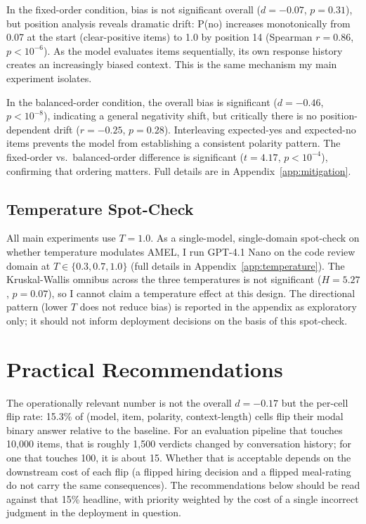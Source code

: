 \documentclass[10pt,twocolumn]{article}
\begin{document}
In the fixed-order condition, bias is not significant overall ($d = -0.07$, $p = 0.31$), but position analysis reveals dramatic drift: P(no) increases monotonically from 0.07 at the start (clear-positive items) to 1.0 by position 14 (Spearman $r = 0.86$, $p < 10^{-6}$).
As the model evaluates items sequentially, its own response history creates an increasingly biased context. This is the same mechanism my main experiment isolates.

In the balanced-order condition, the overall bias is significant ($d = -0.46$, $p < 10^{-8}$), indicating a general negativity shift, but critically there is no position-dependent drift ($r = -0.25$, $p = 0.28$).
Interleaving expected-yes and expected-no items prevents the model from establishing a consistent polarity pattern.
The fixed-order vs.\ balanced-order difference is significant ($t = 4.17$, $p < 10^{-4}$), confirming that ordering matters.
Full details are in Appendix~\ref{app:mitigation}.

\subsection{Temperature Spot-Check}
\label{sec:temperature}

All main experiments use $T = 1.0$. As a single-model, single-domain spot-check on whether temperature modulates AMEL, I run GPT-4.1 Nano on the code review domain at $T \in \{0.3, 0.7, 1.0\}$ (full details in Appendix~\ref{app:temperature}). The Kruskal-Wallis omnibus across the three temperatures is not significant ($H = 5.27$, $p = 0.07$), so I cannot claim a temperature effect at this design. The directional pattern (lower $T$ does not reduce bias) is reported in the appendix as exploratory only; it should not inform deployment decisions on the basis of this spot-check.


\section{Practical Recommendations}
\label{sec:implications}

The operationally relevant number is not the overall $d = -0.17$ but the per-cell flip rate: 15.3\% of (model, item, polarity, context-length) cells flip their modal binary answer relative to the baseline. For an evaluation pipeline that touches 10,000 items, that is roughly 1,500 verdicts changed by conversation history; for one that touches 100, it is about 15. Whether that is acceptable depends on the downstream cost of each flip (a flipped hiring decision and a flipped meal-rating do not carry the same consequences). The recommendations below should be read against that 15\% headline, with priority weighted by the cost of a single incorrect judgment in the deployment in question.
\end{document}
